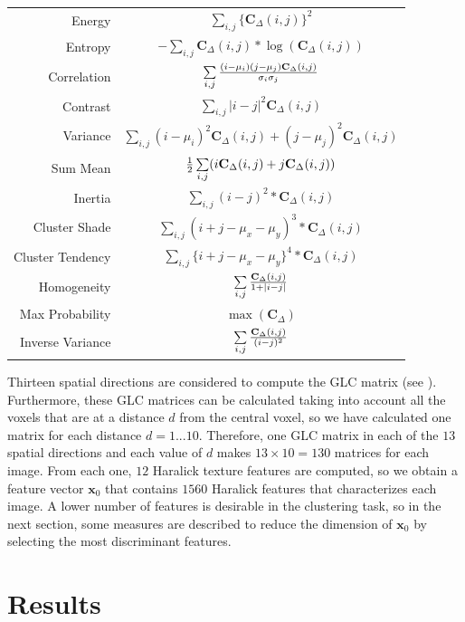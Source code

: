 \begin{center}
	\begin{tabular}{r|c}
		Energy & $\sum\limits_{i,j} \{ \mathbf{C}_{\Delta}(i,j)\}^2 $\\
		Entropy & $-\sum\limits_{i,j} \mathbf{C}_{\Delta}(i,j)*\log(\mathbf{C}_{\Delta}(i,j)) $\\
		Correlation & $\sum\limits_{i,j} {{(i-\mu_i)(j-\mu_j)\mathbf{C}_{\Delta}(i,j)}\over{\sigma_i\sigma_j}}$\\
		Contrast & $\sum\limits_{i,j} |i-j|^2 \mathbf{C}_{\Delta}(i,j)$ \\
		Variance & $\sum\limits_{i,j} (i-\mu_i)^2 \mathbf{C}_{\Delta}(i,j)+ (j-\mu_j)^2\mathbf{C}_{\Delta}(i,j)$\\
		Sum Mean & ${1 \over 2} \sum\limits_{i,j}(i\mathbf{C}_{\Delta}(i,j)+j\mathbf{C}_{\Delta}(i,j))$\\
		Inertia & $\sum\limits_{i,j}(i-j)^2*\mathbf{C}_{\Delta}(i,j)$\\
		Cluster Shade & $\sum\limits_{i,j}(i+j-\mu_x-\mu_y)^3 * \mathbf{C}_{\Delta}(i,j)$\\
		Cluster Tendency & $\sum\limits_{i,j}\{ i+j-\mu_x-\mu_y\}^4*\mathbf{C}_{\Delta}(i,j)$\\
		Homogeneity & $\sum\limits_{i,j} {\mathbf{C}_{\Delta}(i,j) \over 1+|i-j|}$\\
		Max Probability & $\max (\mathbf{C}_{\Delta})$\\
		Inverse Variance & $\sum\limits_{i,j} {\mathbf{C}_{\Delta}(i,j) \over (i-j)^2}$\\
	\end{tabular}
\end{center}

Thirteen spatial directions are considered to compute the GLC matrix (see  \cite{Philips2008}). Furthermore, these GLC matrices can be calculated taking into account all the voxels that are at a distance $d$ from the central voxel, so we have calculated one matrix for each distance $d=1...10$. Therefore, one GLC matrix in each of the $13$ spatial directions and each value of $d$ makes $13\times10=130$ matrices for each image. From each one, $12$ Haralick texture features are computed, so we obtain a feature vector $\mathbf{x}_0$ that contains $1560$ Haralick features that characterizes each image. A lower number of features is desirable in the clustering task, so in the next section, some measures are described to reduce the dimension of $\mathbf{x}_0$ by selecting the most discriminant features. 

\section{Results}\label{sec:ch5results}
